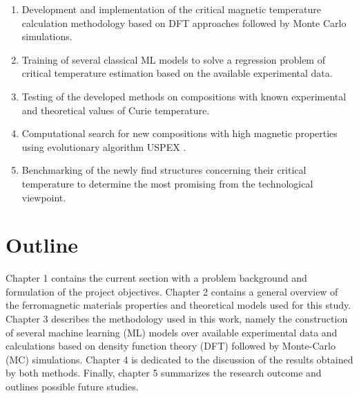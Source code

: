 \begin{enumerate}
\item Development and implementation of the critical magnetic temperature calculation methodology based on DFT approaches followed by Monte Carlo simulations.
\item Training of several classical ML models to solve a regression problem of critical temperature estimation based on the available experimental data.
\item Testing of the developed methods on compositions with known experimental and theoretical values of Curie temperature.
\item Computational search for new compositions with high magnetic properties using evolutionary algorithm USPEX \cite{Oganov_2006, Oganov_2011,  Oganov_2013}.
\item Benchmarking of the newly find structures concerning their critical temperature to
determine the most promising from the technological viewpoint.
\end{enumerate}

\section{Outline}

Chapter 1 contains the current section with a problem background and formulation of the project objectives. Chapter 2 contains a general overview of the ferromagnetic materials properties and theoretical models used for this study. Chapter 3 describes the methodology used in this work, namely the construction of several machine learning (ML) models over available experimental data and calculations based on density function theory (DFT) followed by Monte-Carlo (MC) simulations. Chapter 4 is dedicated to the discussion of the results obtained by both methods. Finally, chapter 5 summarizes the research outcome and outlines possible future studies.



